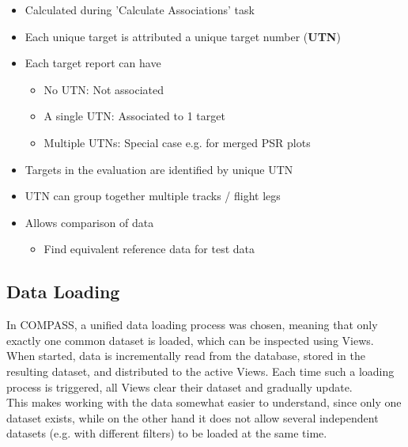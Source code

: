 \begin{itemize}
\item Calculated during 'Calculate Associations' task
\item Each unique target is attributed a unique target number (\textbf{UTN})
\item Each target report can have
\begin{itemize}
\item No UTN: Not associated
\item A single UTN: Associated to 1 target
\item Multiple UTNs: Special case e.g. for merged PSR plots
\end{itemize}
\item Targets in the evaluation are identified by unique UTN
\item UTN can group together multiple tracks / flight legs
\item Allows comparison of data
\begin{itemize}
\item Find equivalent reference data for test data
\end{itemize}
\end{itemize}

\subsection*{Data Loading}
In COMPASS, a unified data loading process was chosen, meaning that only exactly one common dataset is loaded, which can be inspected using Views. \\

When started, data is incrementally read from the database, stored in the resulting dataset, and distributed to the active Views. Each time such a loading process is triggered, all Views clear their dataset and gradually update. \\

This makes working with the data somewhat easier to understand, since only one dataset exists, while on the other hand it does not allow several independent datasets (e.g. with different filters) to be loaded at the same time. \\

